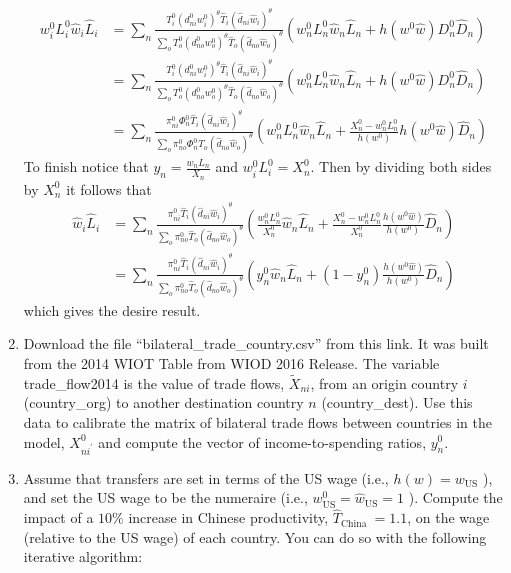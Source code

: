 \documentclass[12pt,oneside,reqno]{article}
\begin{document}
\begin{enumerate}[leftmargin=*, label=\textbf{(\roman*)}]
    \begin{align*}
        w^0_iL^0_i  \hat{w}_i\hat{L}_i &= \sum_{n}\frac{T_i^0\left(d_{ni}^0w_i^0\right)^\theta \hat{T}_i\left(\hat{d}_{ni}\hat{w}_i\right)^\theta}{\sum_{o}T_o^0\left(d_{no}^0w_o^0\right)^\theta \hat{T}_o\left(\hat{d}_{no}\hat{w}_o\right)^\theta}\left( w_n^0L_n^0\hat{w}_n\hat{L}_n +  h(w^0\hat{w})D_n^0\hat{D}_n\right) \\ 
        &= \sum_{n}\frac{T_i^0\left(d_{ni}^0w_i^0\right)^\theta \hat{T}_i\left(\hat{d}_{ni}\hat{w}_i\right)^\theta}{\sum_{o}T_o^0\left(d_{no}^0w_o^0\right)^\theta \hat{T}_o\left(\hat{d}_{no}\hat{w}_o\right)^\theta}\left( w_n^0L_n^0\hat{w}_n\hat{L}_n +  h(w^0\hat{w})D_n^0\hat{D}_n\right) \\ 
        &= \sum_{n}\frac{\pi_{ni}^0\Phi_n^0 \hat{T}_i\left(\hat{d}_{ni}\hat{w}_i\right)^\theta}{\sum_{o}\pi_{no}^0\Phi_n^0 \hat{T}_o\left(\hat{d}_{no}\hat{w}_o\right)^\theta}\left( w_n^0L_n^0\hat{w}_n\hat{L}_n +  \frac{X_n^0-w_n^0L_n^0}{h(w^0)}h(w^0\hat{w})\hat{D}_n\right)
    \end{align*}
    To finish notice that $y_n=\frac{w_nL_n}{X_n}$ and  $w^0_iL^0_i = X_n^0$. Then by dividing both sides by $X_n^0$ it follows that 
    \begin{align*}
        \hat{w}_i\hat{L}_i&= \sum_{n}\frac{\pi_{ni}^0 \hat{T}_i\left(\hat{d}_{ni}\hat{w}_i\right)^\theta}{\sum_{o}\pi_{no}^0\hat{T}_o\left(\hat{d}_{no}\hat{w}_o\right)^\theta}\left( \frac{w_n^0L_n^0}{X_n^0}\hat{w}_n\hat{L}_n +  \frac{X_n^0-w_n^0L_n^0}{X_n^0}\frac{h(w^0\hat{w})}{h(w^0)}\hat{D}_n\right) \\ 
        &= \sum_{n}\frac{\pi_{ni}^0 \hat{T}_i\left(\hat{d}_{ni}\hat{w}_i\right)^\theta}{\sum_{o}\pi_{no}^0\hat{T}_o\left(\hat{d}_{no}\hat{w}_o\right)^\theta}\left( y_n^0\hat{w}_n\hat{L}_n +  (1-y_n^0)\frac{h(w^0\hat{w})}{h(w^0)}\hat{D}_n\right)
    \end{align*}
    which gives the desire result. 
    \item Download the file ``bilateral\_trade\_country.csv'' from this link. It was built from the 2014 WIOT Table from WIOD 2016 Release. The variable trade\_flow2014 is the value of trade flows, $\tilde{X}_{n i}$, from an origin country $i$ (country\_org) to another destination country $n$ (country\_dest). Use this data to calibrate the matrix of bilateral trade flows between countries in the model, $X_{n i^{\prime}}^{0}$ and compute the vector of income-to-spending ratios, $y_{n}^{0}$.
    \item Assume that transfers are set in terms of the US wage (i.e., $h(w)=w_{\mathrm{US}}$ ), and set the US wage to be the numeraire (i.e., $w_{\mathrm{US}}^{0}=\hat{w}_{\mathrm{US}}=1$ ). Compute the impact of a $10 \%$ increase in Chinese productivity, $\hat{T}_{\text {China }}=1.1$, on the wage (relative to the US wage) of each country. You can do so with the following iterative algorithm:

\end{enumerate}
\end{document}
